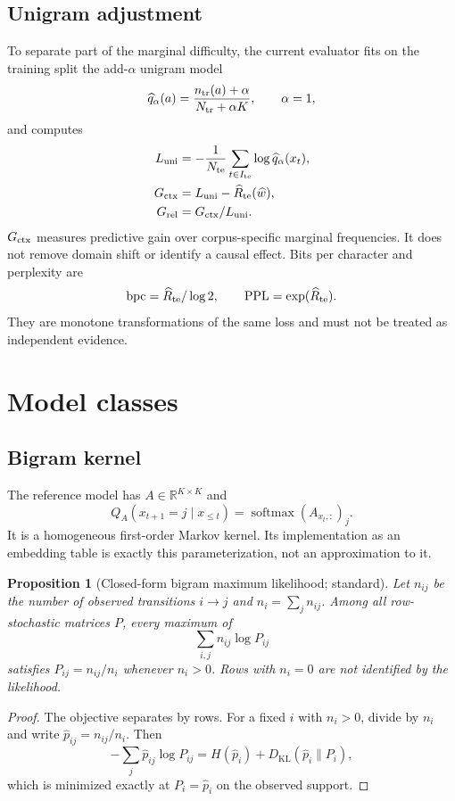 \documentclass[11pt]{article}
\newtheorem{proposition}[definition]{Proposition}
\newcommand{\R}{\mathbb R}
\newcommand{\1}{\mathbf 1}
\newcommand{\KL}{D_{\mathrm{KL}}}
\newcommand{\softmax}{\operatorname{softmax}}
\newcommand{\PPL}{\operatorname{PPL}}
\begin{document}
\subsection{Unigram adjustment}

To separate part of the marginal difficulty, the current evaluator fits on the
training split the add-$\alpha$ unigram model
\[
 \widehat q_\alpha(a)=\frac{n_{\rm tr}(a)+\alpha}
 {N_{\rm tr}+\alpha K},\qquad \alpha=1,
\]
and computes
\begin{align}
 L_{\rm uni}&=-\frac1{N_{\rm te}}
 \sum_{t\in I_{\rm te}}\log\widehat q_\alpha(x_t),\\
 G_{\rm ctx}&=L_{\rm uni}-\widehat R_{\rm te}(\widehat w),\\
 G_{\rm rel}&=G_{\rm ctx}/L_{\rm uni}.
\end{align}
$G_{\rm ctx}$ measures predictive gain over corpus-specific marginal
frequencies. It does not remove domain shift or identify a causal effect. Bits
per character and perplexity are
\[
 \operatorname{bpc}=\widehat R_{\rm te}/\log 2,
 \qquad \PPL=\exp(\widehat R_{\rm te}).
\]
They are monotone transformations of the same loss and must not be treated as
independent evidence.

\section{Model classes}

\subsection{Bigram kernel}

The reference model has $A\in\R^{K\times K}$ and
\[
 Q_A(x_{t+1}=j\mid x_{\le t})=\softmax(A_{x_t,:})_j.
\]
It is a homogeneous first-order Markov kernel. Its implementation as an
embedding table is exactly this parameterization, not an approximation to it.

\begin{proposition}[Closed-form bigram maximum likelihood; standard]
Let $n_{ij}$ be the number of observed transitions $i\to j$ and
$n_i=\sum_jn_{ij}$. Among all row-stochastic matrices $P$, every maximum of
\[
 \sum_{i,j}n_{ij}\log P_{ij}
\]
satisfies $P_{ij}=n_{ij}/n_i$ whenever $n_i>0$. Rows with $n_i=0$ are not
identified by the likelihood.
\end{proposition}

\begin{proof}
The objective separates by rows. For a fixed $i$ with $n_i>0$, divide by
$n_i$ and write $\widehat p_{ij}=n_{ij}/n_i$. Then
\[
 -\sum_j\widehat p_{ij}\log P_{ij}
 =H(\widehat p_i)+\KL(\widehat p_i\|P_i),
\]
which is minimized exactly at $P_i=\widehat p_i$ on the observed support.
\end{proof}
\end{document}
